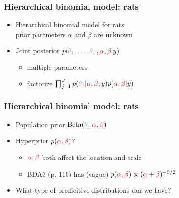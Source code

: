 \documentclass[10pt]{beamer}
\begin{document}
\begin{frame}[fragile]

\frametitle{Hierarchical binomial model: rats}

  \begin{itemize}
  \item Hierarchical binomial model for rats\\
    prior parameters {\color{red} $\alpha$} and {\color{red} $\beta$} are unknown
\end{itemize}
    \begin{minipage}[t]{4cm}
    \end{minipage}
  \begin{itemize}
    \item Joint posterior
      $p({\color{uulgr}\theta_1,\ldots,\theta_J},{\color{red}\alpha},{\color{red}\beta}|y)$
      \begin{itemize}
    \item multiple parameters
      \pause
      \item factorize
        $\prod_{j=1}^J p({\color{uulgr}\theta_j}|{\color{red}\alpha,\beta},y)p({\color{red}\alpha,\beta}|y)$
\end{itemize}
\end{itemize}
\end{frame}

\begin{frame}

\frametitle{Hierarchical binomial model: rats}

  \begin{itemize}
  \item Population prior $\Beta({\color{uulgr}\theta_j}|{\color{red}\alpha,\beta})$
  \item Hyperprior $p({\color{red}\alpha,\beta})$?
    \begin{itemize}
    \item ${\color{red}\alpha,\beta}$ both affect the location and scale
    \item BDA3 (p. 110) has (vague)
      $p({\color{red}\alpha,\beta})\propto({\color{red}\alpha}+{\color{red}\beta})^{-5/2}$
    \end{itemize}
    \pause
    \item {\color{uured} What type of predicitive distributions can we have?}
    \end{itemize}
\end{frame}
\end{document}
